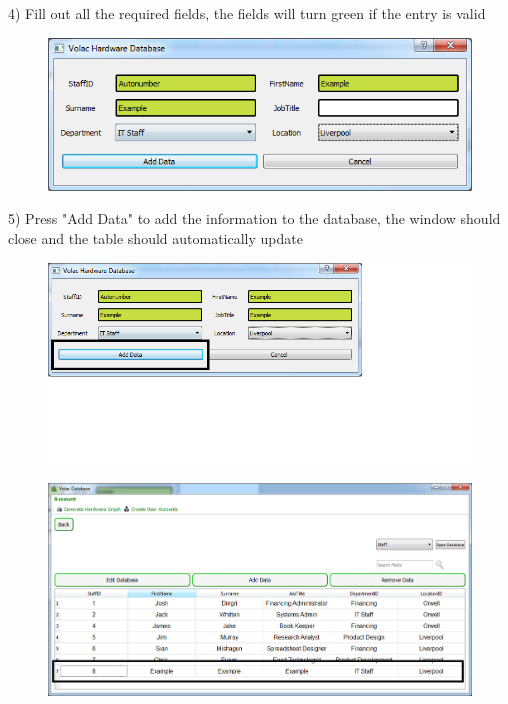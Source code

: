 4) Fill out all the required fields, the fields will turn green if the entry is valid

\begin{figure}[H]
    \includegraphics[width=\textwidth]{./Manual/Images/adddata2.png}
\end{figure}

5) Press "Add Data" to add the information to the database, the window should close and the table should automatically update

\begin{figure}[H]
    \includegraphics[width=\textwidth]{./Manual/Images/adddata3.png}
\end{figure}

\begin{figure}[H]
    \includegraphics[width=\textwidth]{./Manual/Images/adddata4.png}
\end{figure}

